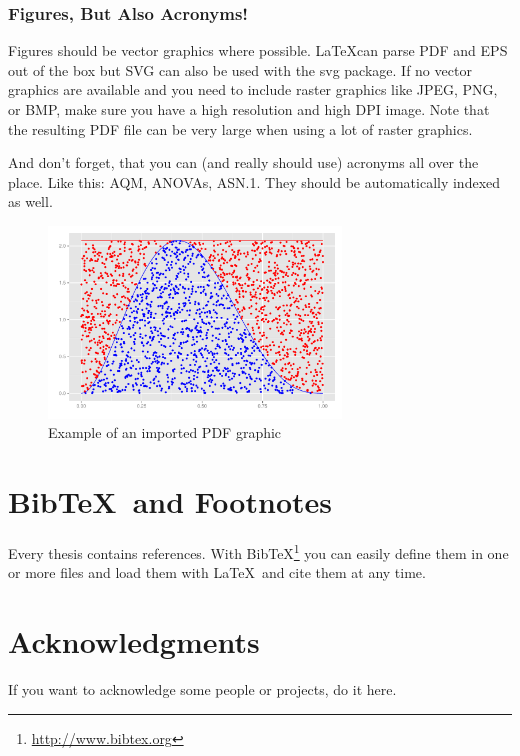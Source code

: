 \documentclass[masterthesis, english]{mas-thesis-chapters} %
\begin{document}
\subsection{Figures, But Also Acronyms!}

Figures should be vector graphics where possible. \LaTeX can parse PDF and EPS out of the box but SVG can also be used with the svg package. If no vector graphics are available and you need to include raster graphics like JPEG, PNG, or BMP, make sure you have a high resolution and high DPI image. Note that the resulting PDF file can be very large when using a lot of raster graphics.

And don't forget, that you can (and really should use) acronyms all over the place. Like this: \gls{AQM}, \glspl{ANOVA}, \acrshort{ASN.1}. They should be automatically indexed as well.

\begin{figure}[ht]
	\centering
	\includegraphics[height=5.1cm]{graphics/demo-graphic.pdf}
	\caption{Example of an imported PDF graphic}
	\label{figure:1}
\end{figure}



\chapter{Bib\TeX\ and Footnotes}

Every thesis contains references. With Bib\TeX\footnote{\url{http://www.bibtex.org}} you can easily define them in one or more files and load them with \LaTeX\ and cite them at any time.\cite{exampleBook}



\chapter*{Acknowledgments}

If you want to acknowledge some people or projects, do it here.



\printbibliography[heading=bibintoc]
\end{document}
